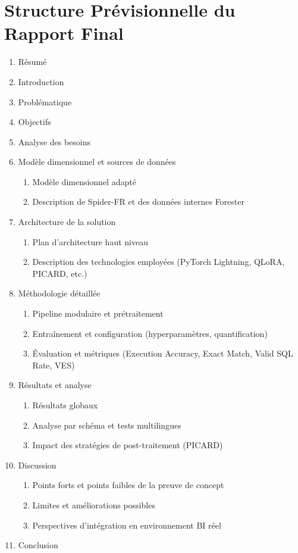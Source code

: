 \documentclass[12pt]{article}
\begin{document}
\newpage

\section{Structure Prévisionnelle du Rapport Final}
\begin{enumerate}
  \item Résumé
  \item Introduction
  \item Problématique
  \item Objectifs
  \item Analyse des besoins
  \item Modèle dimensionnel et sources de données
    \begin{enumerate}
      \item Modèle dimensionnel adapté
      \item Description de Spider-FR et des données internes Forester
    \end{enumerate}
  \item Architecture de la solution
    \begin{enumerate}
      \item Plan d’architecture haut niveau
      \item Description des technologies employées (PyTorch Lightning, QLoRA, PICARD, etc.)
    \end{enumerate}
  \item Méthodologie détaillée
    \begin{enumerate}
      \item Pipeline modulaire et prétraitement
      \item Entraînement et configuration (hyperparamètres, quantification)
      \item Évaluation et métriques (Execution Accuracy, Exact Match, Valid SQL Rate, VES)
    \end{enumerate}
  \item Résultats et analyse
    \begin{enumerate}
      \item Résultats globaux
      \item Analyse par schéma et tests multilingues
      \item Impact des stratégies de post-traitement (PICARD)
    \end{enumerate}
  \item Discussion
    \begin{enumerate}
      \item Points forts et points faibles de la preuve de concept
      \item Limites et améliorations possibles
      \item Perspectives d’intégration en environnement BI réel
    \end{enumerate}
  \item Conclusion
\end{enumerate}

\nocite{busany2024autobir,jiang2024siriusbi,liu2025nl2sqlsurvey,minaee2025llmsurvey,vaswani2023attentionneed,yu2019spider}



\end{document}
